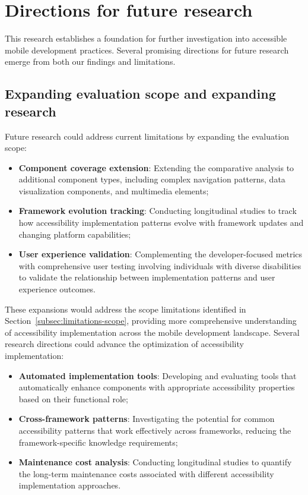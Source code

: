 \section{Directions for future research}
\label{sec:future-research}

This research establishes a foundation for further investigation into accessible mobile development practices. Several promising directions for future research emerge from both our findings and limitations.

\subsection{Expanding evaluation scope and expanding research}
\label{subsec:future-expand}

Future research could address current limitations by expanding the evaluation scope:

\begin{itemize}
    \item \textbf{Component coverage extension}: Extending the comparative analysis to additional component types, including complex navigation patterns, data visualization components, and multimedia elements;

    \item \textbf{Framework evolution tracking}: Conducting longitudinal studies to track how accessibility implementation patterns evolve with framework updates and changing platform capabilities;

    \item \textbf{User experience validation}: Complementing the developer-focused metrics with comprehensive user testing involving individuals with diverse disabilities to validate the relationship between implementation patterns and user experience outcomes.
\end{itemize}

These expansions would address the scope limitations identified in Section~\ref{subsec:limitations-scope}, providing more comprehensive understanding of accessibility implementation across the mobile development landscape. Several research directions could advance the optimization of accessibility implementation:

\begin{itemize}
    \item \textbf{Automated implementation tools}: Developing and evaluating tools that automatically enhance components with appropriate accessibility properties based on their functional role;

    \item \textbf{Cross-framework patterns}: Investigating the potential for common accessibility patterns that work effectively across frameworks, reducing the framework-specific knowledge requirements;

    \item \textbf{Maintenance cost analysis}: Conducting longitudinal studies to quantify the long-term maintenance costs associated with different accessibility implementation approaches.
\end{itemize}

